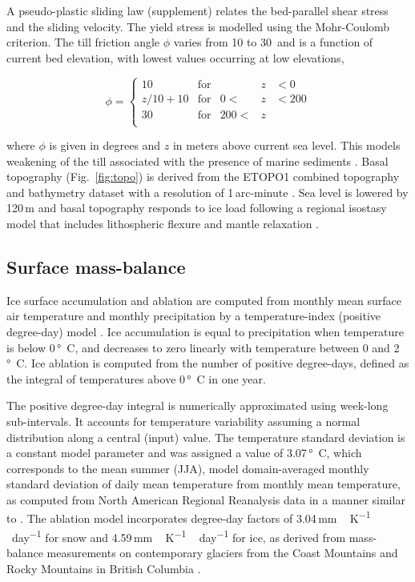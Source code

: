 A pseudo-plastic sliding law \citep{aschwanden-etal-2013} (supplement) relates the bed-parallel shear stress and the sliding velocity. The yield stress is modelled using the Mohr-Coulomb criterion. The till friction angle $\phi$ varies from 10 to 30\degree\ and is a function of current bed elevation, with lowest values occurring at low elevations,

\begin{equation}
	\phi = \left\{\begin{array}{llrll}
		10      & \mathrm{for} &      &z&<  0 \\
		z/10+10 & \mathrm{for} &   0 <&z&<200 \\
		30      & \mathrm{for} & 200 <&z&     \\
	\end{array}\right.
\end{equation}

where $\phi$ is given in degrees and $z$ in meters above current sea level. This models weakening of the till associated with the presence of marine sediments \citep{martin-etal-2011,aschwanden-etal-2013}. Basal topography (Fig.~\ref{fig:topo}) is derived from the ETOPO1 combined topography and bathymetry dataset with a resolution of 1\,arc-minute \citep{data:etopo1}. Sea level is lowered by 120\,m and basal topography responds to ice load following a regional isostasy model that includes lithospheric flexure and mantle relaxation \citep{lingle-clark-1985}.


\subsection{Surface mass-balance}

Ice surface accumulation and ablation are computed from monthly mean surface air temperature and monthly precipitation by a temperature-index (positive degree-day) model \citep{hock-2003}. Ice accumulation is equal to precipitation when temperature is below 0\,\unit{\degree C}, and decreases to zero linearly with temperature between 0 and 2\,\unit{\degree C}. Ice ablation is computed from the number of positive degree-days, defined as the integral of temperatures above 0\,\unit{\degree C} in one year. 

The positive degree-day integral \citep{calov-greve-2005} is numerically approximated using week-long sub-intervals. It accounts for temperature variability assuming a normal distribution along a central (input) value. The temperature standard deviation is a constant model parameter and was assigned a value of 3.07\,\unit{\degree C}, which corresponds to the mean summer (JJA), model domain-averaged monthly standard deviation of daily mean temperature from monthly mean temperature, as computed from North American Regional Reanalysis data \citep{data:narr} in a manner similar to \citet{seguinot-inpress}. The ablation model incorporates degree-day factors of 3.04\,\unit{mm\,K^{-1}\,day^{-1}} for snow and 4.59\,\unit{mm\,K^{-1}\,day^{-1}} for ice, as derived from mass-balance measurements on contemporary glaciers from the Coast Mountains and Rocky Mountains in British Columbia \citep{shea-etal-2009}.


